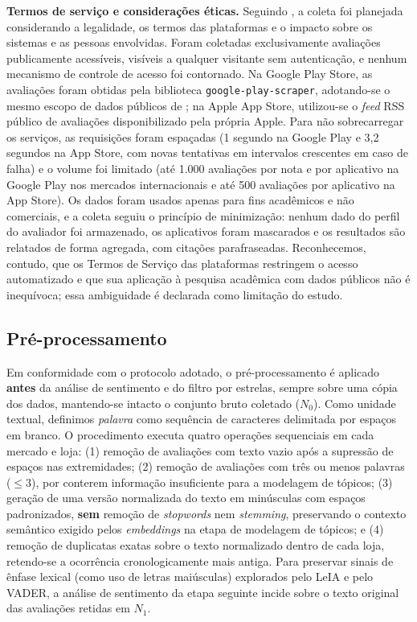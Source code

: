 \textbf{Termos de serviço e considerações éticas.} Seguindo \textcite{krotov2020}, a coleta foi planejada considerando a legalidade, os termos das plataformas e o impacto sobre os sistemas e as pessoas envolvidas. Foram coletadas exclusivamente avaliações publicamente acessíveis, visíveis a qualquer visitante sem autenticação, e nenhum mecanismo de controle de acesso foi contornado. Na Google Play Store, as avaliações foram obtidas pela biblioteca \texttt{google-play-scraper}, adotando-se o mesmo escopo de dados públicos de \textcite{alsebayel2025}; na Apple App Store, utilizou-se o \textit{feed} RSS público de avaliações disponibilizado pela própria Apple. Para não sobrecarregar os serviços, as requisições foram espaçadas (1 segundo na Google Play e 3,2 segundos na App Store, com novas tentativas em intervalos crescentes em caso de falha) e o volume foi limitado (até 1.000 avaliações por nota e por aplicativo na Google Play nos mercados internacionais e até 500 avaliações por aplicativo na App Store). Os dados foram usados apenas para fins acadêmicos e não comerciais, e a coleta seguiu o princípio de minimização: nenhum dado do perfil do avaliador foi armazenado, os aplicativos foram mascarados e os resultados são relatados de forma agregada, com citações parafraseadas. Reconhecemos, contudo, que os Termos de Serviço das plataformas restringem o acesso automatizado e que sua aplicação à pesquisa acadêmica com dados públicos não é inequívoca; essa ambiguidade é declarada como limitação do estudo.

\subsection{Pré-processamento}

Em conformidade com o protocolo adotado, o pré-processamento é aplicado \textbf{antes} da análise de sentimento e do filtro por estrelas, sempre sobre uma cópia dos dados, mantendo-se intacto o conjunto bruto coletado ($N_0$). Como unidade textual, definimos \textit{palavra} como sequência de caracteres delimitada por espaços em branco. O procedimento executa quatro operações sequenciais em cada mercado e loja: (1) remoção de avaliações com texto vazio após a supressão de espaços nas extremidades; (2) remoção de avaliações com três ou menos palavras ($\le 3$), por conterem informação insuficiente para a modelagem de tópicos; (3) geração de uma versão normalizada do texto em minúsculas com espaços padronizados, \textbf{sem} remoção de \textit{stopwords} nem \textit{stemming}, preservando o contexto semântico exigido pelos \textit{embeddings} na etapa de modelagem de tópicos; e (4) remoção de duplicatas exatas sobre o texto normalizado dentro de cada loja, retendo-se a ocorrência cronologicamente mais antiga. Para preservar sinais de ênfase lexical (como uso de letras maiúsculas) explorados pelo LeIA e pelo VADER, a análise de sentimento da etapa seguinte incide sobre o texto original das avaliações retidas em $N_1$.

